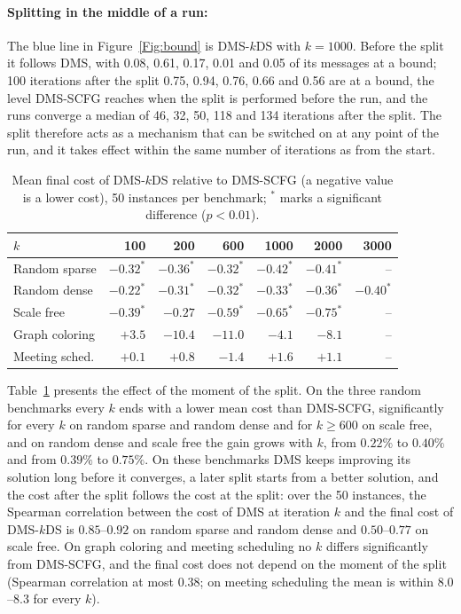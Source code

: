 \paragraph{Splitting in the middle of a run:}
The blue line in Figure~\ref{Fig:bound} is DMS-$k$DS with $k = 1000$. Before the split it follows DMS, with 0.08, 0.61, 0.17, 0.01 and 0.05 of its messages at a bound; 100 iterations after the split 0.75, 0.94, 0.76, 0.66 and 0.56 are at a bound, the level DMS-SCFG reaches when the split is performed before the run, and the runs converge a median of 46, 32, 50, 118 and 134 iterations after the split. The split therefore acts as a mechanism that can be switched on at any point of the run, and it takes effect within the same number of iterations as from the start.

\begin{table}[t]
\centering
\small
\caption{Mean final cost of DMS-$k$DS relative to DMS-SCFG (a negative value is a lower cost), 50 instances per benchmark; $^{*}$ marks a significant difference ($p < 0.01$).}
\label{Tab:delay}
\begin{tabular}{lrrrrrr}
$k$ & 100 & 200 & 600 & 1000 & 2000 & 3000 \\ \hline
Random sparse & $-0.32^{*}$ & $-0.36^{*}$ & $-0.32^{*}$ & $-0.42^{*}$ & $-0.41^{*}$ & -- \\
Random dense & $-0.22^{*}$ & $-0.31^{*}$ & $-0.32^{*}$ & $-0.33^{*}$ & $-0.36^{*}$ & $-0.40^{*}$ \\
Scale free & $-0.39^{*}$ & $-0.27$ & $-0.59^{*}$ & $-0.65^{*}$ & $-0.75^{*}$ & -- \\
Graph coloring & $+3.5$ & $-10.4$ & $-11.0$ & $-4.1$ & $-8.1$ & -- \\
Meeting sched. & $+0.1$ & $+0.8$ & $-1.4$ & $+1.6$ & $+1.1$ & -- \\
\end{tabular}
\end{table}

Table~\ref{Tab:delay} presents the effect of the moment of the split. On the three random benchmarks every $k$ ends with a lower mean cost than DMS-SCFG, significantly for every $k$ on random sparse and random dense and for $k \ge 600$ on scale free, and on random dense and scale free the gain grows with $k$, from $0.22\%$ to $0.40\%$ and from $0.39\%$ to $0.75\%$. On these benchmarks DMS keeps improving its solution long before it converges, a later split starts from a better solution, and the cost after the split follows the cost at the split: over the 50 instances, the Spearman correlation between the cost of DMS at iteration $k$ and the final cost of DMS-$k$DS is $0.85$--$0.92$ on random sparse and random dense and $0.50$--$0.77$ on scale free. On graph coloring and meeting scheduling no $k$ differs significantly from DMS-SCFG, and the final cost does not depend on the moment of the split (Spearman correlation at most $0.38$; on meeting scheduling the mean is within $8.0$--$8.3$ for every $k$).

